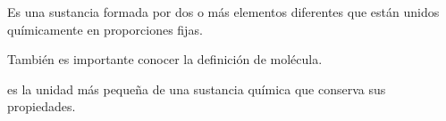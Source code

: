 %
\begin{definition}
    Es una sustancia formada por dos o más elementos diferentes que están unidos químicamente en proporciones fijas.
\end{definition}
También es importante conocer la definición de molécula.
\begin{definition}[Molécula]
    es la unidad más pequeña de una sustancia química que conserva sus propiedades.
\end{definition}
